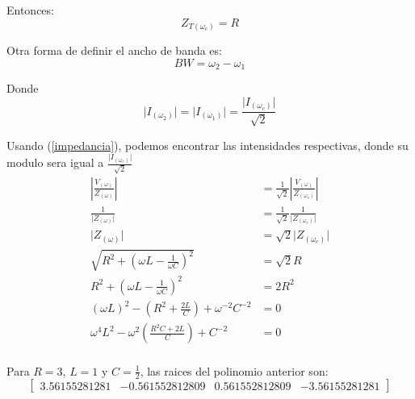 \documentclass[a4paper,12pt]{report}
\begin{document}
\begin{enumerate}[label=\alph*), left=0pt]
                Entonces:
                \begin{equation*}
                    Z_{T(\omega_c)} = R
                \end{equation*}

                Otra forma de definir el ancho de banda es:
                \begin{equation}
                    \label{ancho.de.banda.2}
                    BW = \omega_2 - \omega_1
                \end{equation}

                Donde
                \begin{equation*}
                    \lvert I_{(\omega_2)} \rvert = \lvert I_{(\omega_1)} \rvert = \frac{\lvert I_{(\omega_c)} \rvert}
                        {\sqrt{2}}
                \end{equation*}

                Usando (\ref{impedancia}), podemos encontrar las intensidades respectivas, donde su modulo sera igual a
                $\frac{\lvert I_{(\omega_c)} \rvert}{\sqrt{2}}$
                \begin{align*}
                    \left\lvert \frac{V_{(\omega)}}{Z_{(\omega)}} \right\rvert &=
                        \frac{1}{\sqrt{2}} \left\lvert \frac{V_{(\omega)}}{Z_{(\omega_c)}} \right\rvert\\
                    \frac{1}{\lvert Z_{(\omega)} \rvert} &= \frac{1}{\sqrt{2}} \frac{1}{\lvert Z_{(\omega_c)} \rvert}\\
                    \lvert Z_{(\omega)} \rvert &= \sqrt{2} \lvert Z_{(\omega_c)} \rvert\\
                    \sqrt{R^2 + \left(\omega L - \frac{1}{\omega C}\right)^2} &= \sqrt{2} R\\
                    R^2 + \left(\omega L - \frac{1}{\omega C}\right)^2 &= 2 R^2\\
                    (\omega L)^2 - \left(R^2 + \frac{2 L}{C}\right) + \omega^{-2} C^{-2} &= 0\\
                    \omega^4 L^2 - \omega^2 \left(\frac{R^2 C + 2 L}{C}\right) + C^{-2} &= 0\\
                \end{align*}

                Para $R=3$, $L=1$ y $C=\frac{1}{2}$, las raices del polinomio anterior son:
                \begin{equation*}
                    \begin{bmatrix}
                        3.56155281281 & -0.561552812809 & 0.561552812809 & -3.56155281281
                    \end{bmatrix}
                \end{equation*}


\end{enumerate}
\end{document}
